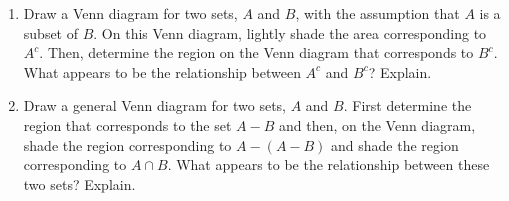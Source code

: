\pagebreak
\begin{previewactivity} \label{PA:workingvenn} \hfill
\begin{enumerate}
\item Draw a Venn diagram for two sets, $A$  and  $B$, with the assumption that  $A$ is a subset of $B$.  On this Venn diagram, lightly shade the area corresponding to  $A^c $.  Then, determine the region on the Venn diagram that corresponds to  $B^c $.  What appears to be the relationship between   $A^c $  and   $B^c $?  Explain.

\item Draw a general Venn diagram for two sets, $A$  and  $B$.  First determine the region that corresponds to the set $A - B$ and then, on the Venn diagram, shade the region corresponding to  $A - (A - B)$  and  shade the region corresponding to  $A \cap B$.  What appears to be the relationship between these two sets?  Explain.

\end{enumerate}
\end{previewactivity}
\hbreak


\endinput

